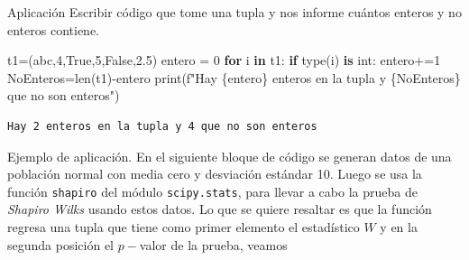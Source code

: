\documentclass[
  ignorenonframetext,
  aspectratio=169,
  spanish,
]{beamer}
\newenvironment{Shaded}{\begin{snugshade}}{\end{snugshade}}
\newcommand{\BuiltInTok}[1]{\textcolor[rgb]{0.00,0.23,0.31}{#1}}
\newcommand{\ControlFlowTok}[1]{\textcolor[rgb]{0.00,0.23,0.31}{\textbf{#1}}}
\newcommand{\DecValTok}[1]{\textcolor[rgb]{0.68,0.00,0.00}{#1}}
\newcommand{\FloatTok}[1]{\textcolor[rgb]{0.68,0.00,0.00}{#1}}
\newcommand{\KeywordTok}[1]{\textcolor[rgb]{0.00,0.23,0.31}{\textbf{#1}}}
\newcommand{\NormalTok}[1]{\textcolor[rgb]{0.00,0.23,0.31}{#1}}
\newcommand{\OperatorTok}[1]{\textcolor[rgb]{0.37,0.37,0.37}{#1}}
\newcommand{\SpecialCharTok}[1]{\textcolor[rgb]{0.37,0.37,0.37}{#1}}
\newcommand{\SpecialStringTok}[1]{\textcolor[rgb]{0.13,0.47,0.30}{#1}}
\newcommand{\StringTok}[1]{\textcolor[rgb]{0.13,0.47,0.30}{#1}}
\newcommand{\VariableTok}[1]{\textcolor[rgb]{0.07,0.07,0.07}{#1}}
\begin{document}
\begin{frame}[fragile]{Aplicación}
\label{aplicaciuxf3n}
Escribir código que tome una tupla y nos informe cuántos enteros y no
enteros contiene.

\begin{Shaded}
\begin{Highlighting}[]
\NormalTok{t1}\OperatorTok{=}\NormalTok{(}\StringTok{\textquotesingle{}abc\textquotesingle{}}\NormalTok{,}\DecValTok{4}\NormalTok{,}\VariableTok{True}\NormalTok{,}\DecValTok{5}\NormalTok{,}\VariableTok{False}\NormalTok{,}\FloatTok{2.5}\NormalTok{) }
\NormalTok{entero }\OperatorTok{=} \DecValTok{0}
\ControlFlowTok{for}\NormalTok{ i }\KeywordTok{in}\NormalTok{ t1:}
    \ControlFlowTok{if} \BuiltInTok{type}\NormalTok{(i) }\KeywordTok{is} \BuiltInTok{int}\NormalTok{:}
\NormalTok{        entero}\OperatorTok{+=}\DecValTok{1}
\NormalTok{NoEnteros}\OperatorTok{=}\BuiltInTok{len}\NormalTok{(t1)}\OperatorTok{{-}}\NormalTok{entero}
\BuiltInTok{print}\NormalTok{(}\SpecialStringTok{f"Hay }\SpecialCharTok{\{}\NormalTok{entero}\SpecialCharTok{\}}\SpecialStringTok{ enteros en la tupla y }\SpecialCharTok{\{}\NormalTok{NoEnteros}\SpecialCharTok{\}}\SpecialStringTok{ que no son enteros"}\NormalTok{)  }
\end{Highlighting}
\end{Shaded}

\begin{verbatim}
Hay 2 enteros en la tupla y 4 que no son enteros
\end{verbatim}
\end{frame}

\begin{frame}[fragile]{Ejemplo de aplicación.}
\label{ejemplo-de-aplicaciuxf3n.}
En el siguiente bloque de código se generan datos de una población
normal con media cero y desviación estándar 10. Luego se usa la función
\texttt{shapiro} del módulo \texttt{scipy.stats}, para llevar a cabo la
prueba de \emph{Shapiro Wilks}  usando
estos datos. Lo que se quiere resaltar es que la función regresa una
tupla que tiene como primer elemento el estadístico \(W\) y en la
segunda posición el \(p-\)valor de la prueba, veamos
\end{frame}
\end{document}
